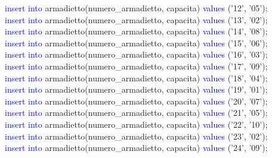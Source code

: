 \documentclass{article}
\begin{document}
\begin{flushleft}
{        \hspace*{0.5em}\textcolor{blue}{insert into} armadietto(numero\_armadietto, capacita) \textcolor{blue}{values} ('12', '05'); \\
        \hspace*{0.5em}\textcolor{blue}{insert into} armadietto(numero\_armadietto, capacita) \textcolor{blue}{values} ('13', '02'); \\
        \hspace*{0.5em}\textcolor{blue}{insert into} armadietto(numero\_armadietto, capacita) \textcolor{blue}{values} ('14', '08'); \\
        \hspace*{0.5em}\textcolor{blue}{insert into} armadietto(numero\_armadietto, capacita) \textcolor{blue}{values} ('15', '06'); \\
        \hspace*{0.5em}\textcolor{blue}{insert into} armadietto(numero\_armadietto, capacita) \textcolor{blue}{values} ('16', '03'); \\
        \hspace*{0.5em}\textcolor{blue}{insert into} armadietto(numero\_armadietto, capacita) \textcolor{blue}{values} ('17', '09'); \\
        \hspace*{0.5em}\textcolor{blue}{insert into} armadietto(numero\_armadietto, capacita) \textcolor{blue}{values} ('18', '04'); \\
        \hspace*{0.5em}\textcolor{blue}{insert into} armadietto(numero\_armadietto, capacita) \textcolor{blue}{values} ('19', '01'); \\
        \hspace*{0.5em}\textcolor{blue}{insert into} armadietto(numero\_armadietto, capacita) \textcolor{blue}{values} ('20', '07'); \\
        \hspace*{0.5em}\textcolor{blue}{insert into} armadietto(numero\_armadietto, capacita) \textcolor{blue}{values} ('21', '05'); \\
        \hspace*{0.5em}\textcolor{blue}{insert into} armadietto(numero\_armadietto, capacita) \textcolor{blue}{values} ('22', '10'); \\
        \hspace*{0.5em}\textcolor{blue}{insert into} armadietto(numero\_armadietto, capacita) \textcolor{blue}{values} ('23', '02'); \\
        \hspace*{0.5em}\textcolor{blue}{insert into} armadietto(numero\_armadietto, capacita) \textcolor{blue}{values} ('24', '09'); \\
}
\end{flushleft}
\end{document}
